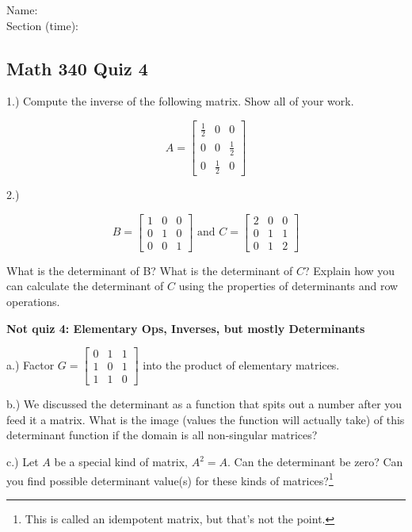 \documentclass{article}
\begin{document}
Name:\\
\medskip
Section (time):

\subsection*{Math 340 Quiz 4}


1.) Compute the inverse of the following matrix. Show all of your work. 

$$A=\left[\begin{array}{ccc}
\frac{1}{2} & 0 &  0\\
0 & 0 & \frac{1}{2}\\
0 & \frac{1}{2} & 0
\end{array}\right]$$
\medskip


2.) 

$$B=\left[\begin{array}{ccc}
1 & 0 &  0\\
0 & 1 & 0\\
0 & 0 & 1
\end{array}\right] \text{ and } C=\left[\begin{array}{ccc}
2 & 0 &  0\\
0 & 1 & 1\\
0 & 1 & 2
\end{array}\right]$$

What is the determinant of B? What is the determinant of $C$? Explain how you can calculate the determinant of $C$ using the properties of determinants and row operations.   

\pagebreak

\textbf{Not quiz 4: Elementary Ops, Inverses, but mostly Determinants}


a.) Factor $G=\left[\begin{array}{ccc}
0 & 1 &  1\\
1 & 0 & 1\\
1& 1 & 0
\end{array}\right]$ into the product of elementary matrices.


b.) We discussed the determinant as a function that spits out a number after you feed it a matrix. What is the image (values the function will actually take) of this determinant function if the domain is all non-singular matrices?

c.) Let $A$ be a special kind of matrix, $A^2=A$. Can the determinant be zero? Can you find possible determinant value(s) for these kinds of matrices?\footnote{This is called an idempotent matrix, but that's not the point.}
\end{document}
